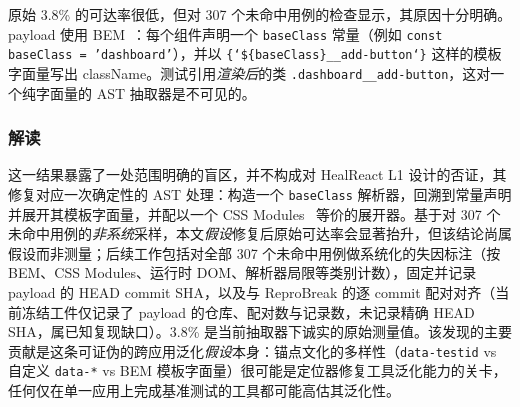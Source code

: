 原始 3.8\% 的可达率很低，但对 307 个未命中用例的检查显示，其原因十分明确。payload 使用 BEM~\cite{bemMethodology}：每个组件声明一个 \texttt{baseClass} 常量（例如 \texttt{const baseClass = 'dashboard'}），并以 \texttt{\{`\$\{baseClass\}\_\_add-button`\}} 这样的模板字面量写出 className。测试引用\emph{渲染后}的类 \texttt{.dashboard\_\_add-button}，这对一个纯字面量的 AST 抽取器是不可见的。

\subsubsection{解读}
这一结果暴露了一处范围明确的盲区，并不构成对 HealReact L1 设计的否证，其修复对应一次确定性的 AST 处理：构造一个 \texttt{baseClass} 解析器，回溯到常量声明并展开其模板字面量，并配以一个 CSS Modules~\cite{cssModules} 等价的展开器。基于对 307 个未命中用例的\emph{非系统}采样，本文\emph{假设}修复后原始可达率会显著抬升，但该结论尚属假设而非测量；后续工作包括对全部 307 个未命中用例做系统化的失因标注（按 BEM、CSS Modules、运行时 DOM、解析器局限等类别计数），固定并记录 payload 的 HEAD commit SHA，以及与 ReproBreak 的逐 commit 配对对齐（当前冻结工件仅记录了 payload 的仓库、配对数与记录数，未记录精确 HEAD SHA，属已知复现缺口）。3.8\% 是当前抽取器下诚实的原始测量值。该发现的主要贡献是这条可证伪的跨应用泛化\emph{假设}本身：锚点文化的多样性（\texttt{data-testid} vs 自定义 \texttt{data-*} vs BEM 模板字面量）很可能是定位器修复工具泛化能力的关卡，任何仅在单一应用上完成基准测试的工具都可能高估其泛化性。
